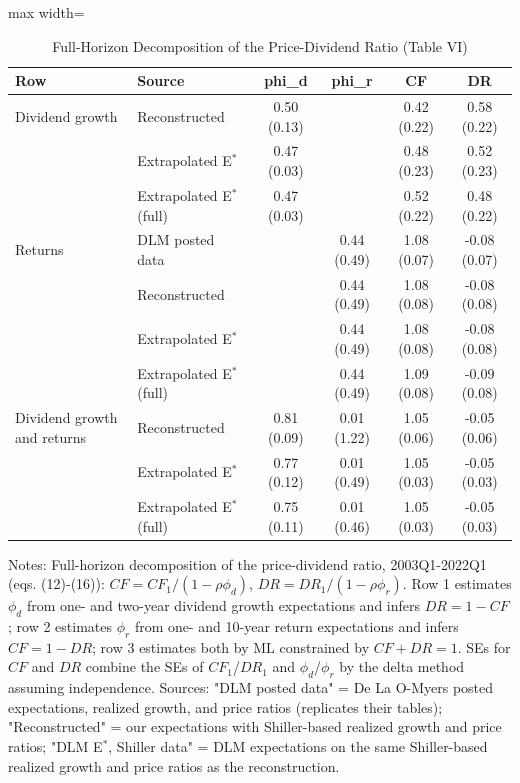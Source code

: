 \documentclass[11pt]{article}
\begin{document}
\begin{table}[H]
\centering
\caption{Full-Horizon Decomposition of the Price-Dividend Ratio (Table VI)}
\label{tab:t6}
\small
\begin{adjustbox}{max width=\textwidth}
\begin{tabular}{llcccc}
\toprule
Row & Source & phi\_d & phi\_r & CF & DR \\
\midrule
Dividend growth & Reconstructed & 0.50 (0.13) &  & 0.42 (0.22) & 0.58 (0.22) \\
 & Extrapolated E$^*$ & 0.47 (0.03) &  & 0.48 (0.23) & 0.52 (0.23) \\
 & Extrapolated E$^*$ (full) & 0.47 (0.03) &  & 0.52 (0.22) & 0.48 (0.22) \\
\addlinespace
Returns & DLM posted data &  & 0.44 (0.49) & 1.08 (0.07) & -0.08 (0.07) \\
 & Reconstructed &  & 0.44 (0.49) & 1.08 (0.08) & -0.08 (0.08) \\
 & Extrapolated E$^*$ &  & 0.44 (0.49) & 1.08 (0.08) & -0.08 (0.08) \\
 & Extrapolated E$^*$ (full) &  & 0.44 (0.49) & 1.09 (0.08) & -0.09 (0.08) \\
\addlinespace
Dividend growth and returns & Reconstructed & 0.81 (0.09) & 0.01 (1.22) & 1.05 (0.06) & -0.05 (0.06) \\
 & Extrapolated E$^*$ & 0.77 (0.12) & 0.01 (0.49) & 1.05 (0.03) & -0.05 (0.03) \\
 & Extrapolated E$^*$ (full) & 0.75 (0.11) & 0.01 (0.46) & 1.05 (0.03) & -0.05 (0.03) \\
\bottomrule
\end{tabular}
\end{adjustbox}

\vspace{2pt}
{\footnotesize Notes: Full-horizon decomposition of the price-dividend ratio, 2003Q1-2022Q1 (eqs. (12)-(16)): $CF = CF_1/(1-\rho\phi_d)$, $DR = DR_1/(1-\rho\phi_r)$. Row 1 estimates $\phi_d$ from one- and two-year dividend growth expectations and infers $DR = 1 - CF$; row 2 estimates $\phi_r$ from one- and 10-year return expectations and infers $CF = 1 - DR$; row 3 estimates both by ML constrained by $CF + DR = 1$. SEs for $CF$ and $DR$ combine the SEs of $CF_1$/$DR_1$ and $\phi_d$/$\phi_r$ by the delta method assuming independence. Sources: "DLM posted data" = De La O-Myers posted expectations, realized growth, and price ratios (replicates their tables); "Reconstructed" = our expectations with Shiller-based realized growth and price ratios; "DLM E$^*$, Shiller data" = DLM expectations on the same Shiller-based realized growth and price ratios as the reconstruction. }
\end{table}
\end{document}

